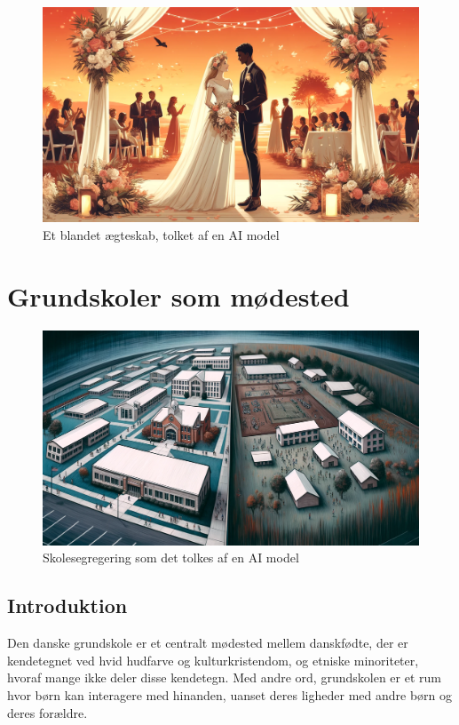 \documentclass[
]{book}
\begin{document}
\begin{figure}
\includegraphics[width=24.89in]{images/dalle-wedding} \caption{Et blandet ægteskab, tolket af en AI model}\label{fig:fig-partner}
\end{figure}

\hypertarget{kap3}{%
\chapter{Grundskoler som mødested}\label{kap3}}

\begin{figure}
\includegraphics[width=24.89in]{images/dalle-schoolseg} \caption{Skolesegregering som det tolkes af en AI model}\label{fig:fig-schoolseg}
\end{figure}

\hypertarget{introduktion}{%
\section{Introduktion}\label{introduktion}}

Den danske grundskole er et centralt mødested mellem danskfødte, der er kendetegnet ved hvid hudfarve og kulturkristendom, og etniske minoriteter, hvoraf mange ikke deler disse kendetegn. Med andre ord, grundskolen er et rum hvor børn kan interagere med hinanden, uanset deres ligheder med andre børn og deres forældre.
\end{document}
